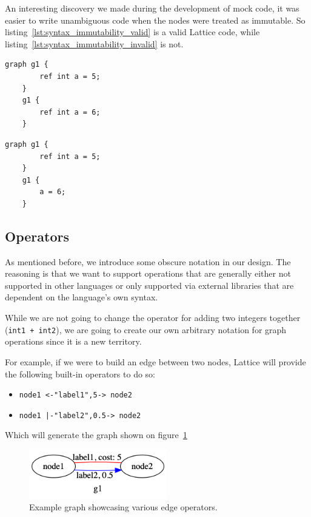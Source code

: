 An interesting discovery we made during the development of mock code, it was easier to write unambiguous code
when the nodes were treated as immutable.
So listing~\ref{lst:syntax_immutability_valid} is a valid Lattice code, while listing~\ref{lst:syntax_immutability_invalid} is not.

\begin{lstlisting}[caption={Valid destruction and recreation of nodes.},captionpos=b,label={lst:syntax_immutability_valid}]
    graph g1 {
        ref int a = 5;
    }
    g1 {
        ref int a = 6;
    }
\end{lstlisting}

\begin{lstlisting}[caption={Code violating the immutability of nodes.},captionpos=b,label={lst:syntax_immutability_invalid}]
    graph g1 {
        ref int a = 5;
    }
    g1 {
        a = 6;
    }
\end{lstlisting}


\subsection{Operators}\label{subsec:syntax_operators}
As mentioned before, we introduce some obscure notation in our design.
The reasoning is that we want to support operations that are generally either not supported in other languages
or only supported via external libraries that are dependent on the language's own syntax.

While we are not going to change the operator for adding two integers together (\lstinline{int1 + int2}),
we are going to create our own arbitrary notation for graph operations since it is a new territory.

For example, if we were to build an edge between two nodes,
Lattice will provide the following built-in operators to do so:

\begin{itemize}
    \item \lstinline{node1 <-"label1",5-> node2}
    \item \lstinline{node1 |-"label2",0.5-> node2}
\end{itemize}

Which will generate the graph shown on figure~\ref{fig:relation_basic_operator}
\begin{figure}[H]
    \centering
    \includegraphics[width=6cm]{figures/syntax_section/syntax_rel_basic}
    \caption{Example graph showcasing various edge operators.}
    \label{fig:relation_basic_operator}
\end{figure}


